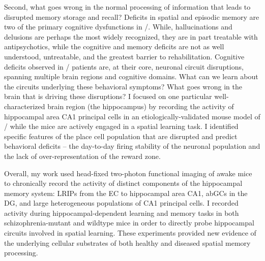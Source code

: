 Second, what goes wrong in the normal processing of information that leads to disrupted memory storage and recall?
Deficits in spatial and episodic memory are two of the primary cognitive dysfunctions in \scz/.
While, hallucinations and delusions are perhaps the most widely recognized, they are in part treatable with antipsychotics, while the cognitive and memory deficits are not as well understood, untreatable, and the greatest barrier to rehabilitation.
Cognitive deficits observed in \scz/ patients are, at their core, neuronal circuit disruptions, spanning multiple brain regions and cognitive domains.
What can we learn about the circuits underlying these behavioral symptoms?
What goes wrong in the brain that is driving these disruptions?
I focused on one particular well-characterized brain region (the hippocampus) by recording the activity of hippocampal area CA1 principal cells in an etiologically-validated mouse model of \scz/ while the mice are actively engaged in a spatial learning task.
I identified specific features of the place cell population that are disrupted and predict behavioral deficits -- the day-to-day firing stability of the neuronal population and the lack of over-representation of the reward zone.

Overall, my work used head-fixed two-photon functional imaging of awake mice to chronically record the activity of distinct components of the hippocampal memory system: \aclp{LRIP} from the \acl{EC} to hippocampal area CA1, \aclp{abGC} in the \acl{DG}, and large heterogeneous populations of CA1 principal cells.
I recorded activity during hippocampal-dependent learning and memory tasks in both schizophrenia-mutant and wildtype mice in order to directly probe hippocampal circuits involved in spatial learning.
These experiments provided new evidence of the underlying cellular substrates of both healthy and diseased spatial memory processing.



